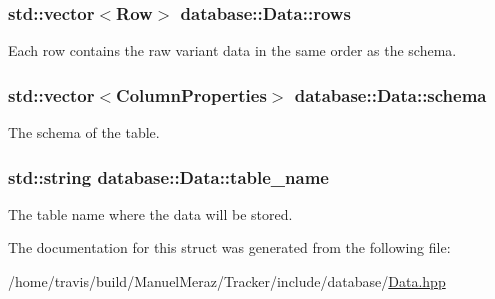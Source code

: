 \subsubsection[{\texorpdfstring{rows}{rows}}]{\setlength{\rightskip}{0pt plus 5cm}std\+::vector$<${\bf Row}$>$ database\+::\+Data\+::rows}\hypertarget{structdatabase_1_1_data_ae45d84ed5b3ce80a7683df0c3f40d518}{}\label{structdatabase_1_1_data_ae45d84ed5b3ce80a7683df0c3f40d518}


Each row contains the raw variant data in the same order as the schema. 

\subsubsection[{\texorpdfstring{schema}{schema}}]{\setlength{\rightskip}{0pt plus 5cm}std\+::vector$<${\bf Column\+Properties}$>$ database\+::\+Data\+::schema}\hypertarget{structdatabase_1_1_data_ae674b19f66a2cdfafa134304121ebbe2}{}\label{structdatabase_1_1_data_ae674b19f66a2cdfafa134304121ebbe2}


The schema of the table. 

\subsubsection[{\texorpdfstring{table\+\_\+name}{table_name}}]{\setlength{\rightskip}{0pt plus 5cm}std\+::string database\+::\+Data\+::table\+\_\+name}\hypertarget{structdatabase_1_1_data_a1a24b475b6698376a166ff80ef0a8fe8}{}\label{structdatabase_1_1_data_a1a24b475b6698376a166ff80ef0a8fe8}


The table name where the data will be stored. 



The documentation for this struct was generated from the following file\+:\begin{DoxyCompactItemize}
\item 
/home/travis/build/\+Manuel\+Meraz/\+Tracker/include/database/\hyperlink{_data_8hpp}{Data.\+hpp}\end{DoxyCompactItemize}
